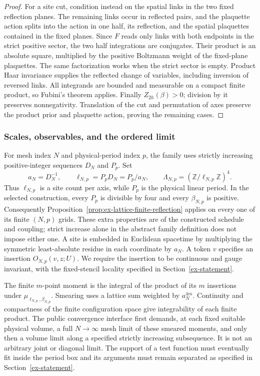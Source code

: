 \begin{proof}
For a site cut, condition instead on the spatial links in the two fixed
reflection planes. The remaining links occur in reflected pairs, and the
plaquette action splits into the action in one half, its reflection, and the
spatial plaquettes contained in the fixed planes. Since $F$ reads only links
with both endpoints in the strict positive sector, the two half integrations
are conjugates. Their product is an absolute square, multiplied by the positive
Boltzmann weight of the fixed-plane plaquettes. The same factorization works
when the strict sector is empty. Product Haar invariance supplies the reflected
change of variables, including inversion of reversed links. All integrands are
bounded and measurable on a compact finite product, so Fubini's theorem
applies. Finally $Z_{2h}(\beta)>0$; division by it preserves nonnegativity.
Translation of the cut and permutation of axes preserve the product prior and
plaquette action, proving the remaining cases.
\end{proof}

\subsubsection{Scales, observables, and the ordered limit}
\label{subsec:ex-lattice-scales}

For mesh index $N$ and physical-period index $p$, the family uses
strictly increasing positive-integer sequences $D_N$ and $P_p$. Set
\[
 a_N=D_N^{-1},\qquad \ell_{N,p}=P_pD_N=P_p/a_N,
 \qquad \Lambda_{N,p}=(\mathbb Z/\ell_{N,p}\mathbb Z)^4.
\]
Thus $\ell_{N,p}$ is a site count per axis, while $P_p$ is the physical linear
period. In the selected construction, every $P_p$ is divisible by four and
every $\beta_{N,p}$ is positive. Consequently Proposition~\ref{prop:ex-lattice-finite-reflection}
applies on every one of its finite $(N,p)$ grids. These extra properties are
of the constructed schedule and coupling; strict increase alone in the abstract
family definition does not impose either one. A site is embedded in Euclidean spacetime by multiplying the symmetric
least-absolute residue in each coordinate by $a_N$. A token $v$ specifies an
insertion $O_{N,p}(v,z;U)$. We require the insertion to be continuous and gauge invariant, with the
fixed-stencil locality specified in Section~\ref{ex-statement}.

The finite $m$-point moment is the integral of the product of its $m$
insertions under $\mu_{\ell_{N,p},\beta_{N,p}}$. Smearing uses a lattice sum
weighted by $a_N^{4m}$. Continuity and compactness of the finite configuration space give
integrability of each finite product. The
public convergence interface first demands, at each fixed
suitable physical volume, a full $N\to\infty$ mesh limit of these smeared
moments, and only then a volume limit along a specified strictly increasing
subsequence. It is not an arbitrary joint or diagonal limit. The support of a
test function must eventually fit inside the period box and its arguments must
remain separated as specified in Section~\ref{ex-statement}.


